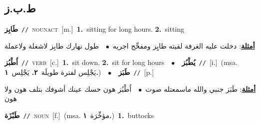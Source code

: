 \documentclass[10pt,a4paper,twoside]{article} %
\begin{document}
\begin{multicols}{2}
{{{{{{{{{{\vspace{-3mm}
\subsection*{\color{blue}\foreignlanguage{arabic}{ط.ب.ز}\color{blue}{}} 

{\setlength\topsep{0pt}\textbf{\foreignlanguage{arabic}{طَابِز}}\ {\color{gray}\texttt{//}\color{black}}\ \textsc{noun\textunderscore act}\ [m.]\ \textbf{1.}~sitting for long hours.  \textbf{2.}~sitting\  \begin{flushright}\color{gray}\foreignlanguage{arabic}{\textbf{\underline{\foreignlanguage{arabic}{أمثلة}}}: دخلت عليه الغرفة لقيته طابِِز ومفحِّج اجريه\ $\bullet$\ \  طول نهارك طابِز لاشغلة ولاعملة}\end{flushright}\color{black}} \vspace{2mm}

{\setlength\topsep{0pt}\textbf{\foreignlanguage{arabic}{اُطْبُز}}\ {\color{gray}\texttt{//}\color{black}}\ \textsc{verb}\ [c.]\ \textbf{1.}~sit down.  \textbf{2.}~sit for long hours\ \ $\bullet$\ \ \setlength\topsep{0pt}\textbf{\foreignlanguage{arabic}{يُطْبُز}}\ {\color{gray}\texttt{//}\color{black}}\ [i.]\ \color{gray}(msa. \foreignlanguage{arabic}{يَجْلِس لفترة طويلَة}~\foreignlanguage{arabic}{\textbf{٢.}}  \foreignlanguage{arabic}{يَجْلِس}~\foreignlanguage{arabic}{\textbf{١.}})\color{black}\ \ $\bullet$\ \ \setlength\topsep{0pt}\textbf{\foreignlanguage{arabic}{طَبَز}}\ {\color{gray}\texttt{//}\color{black}}\ [p.]\  \begin{flushright}\color{gray}\foreignlanguage{arabic}{\textbf{\underline{\foreignlanguage{arabic}{أمثلة}}}: طَبَز جنبي والله ماسمعتله صوت\ $\bullet$\ \  اُطْبُز هون حسك عينك أشوفك بتلف هون ولا هون}\end{flushright}\color{black}} \vspace{2mm}

{\setlength\topsep{0pt}\textbf{\foreignlanguage{arabic}{طَبْزَة}}\ {\color{gray}\texttt{//}\color{black}}\ \textsc{noun}\ [f.]\ \color{gray}(msa. \foreignlanguage{arabic}{مؤخِّرَة}~\foreignlanguage{arabic}{\textbf{١.}})\color{black}\ \textbf{1.}~buttocks\ 

}}}}}}}}}}}
\end{multicols}
\end{document}
